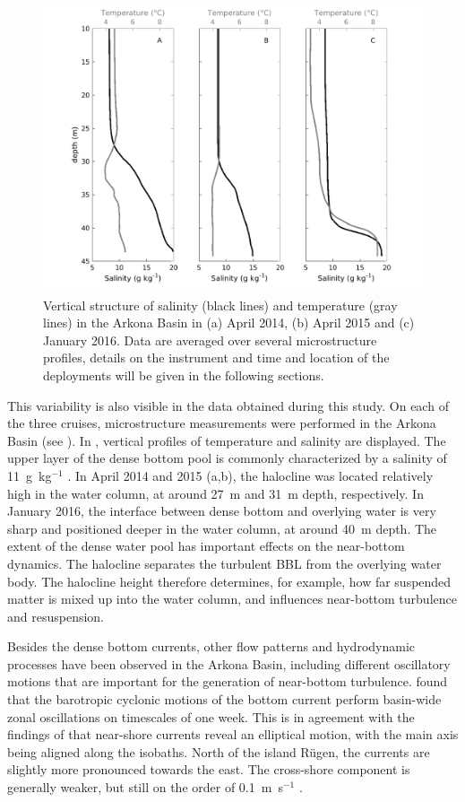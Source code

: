 \begin{figure}[ht]
\includegraphics[width=40pc]{bilder/arkona_TS.png}
 \caption{Vertical structure of salinity (black lines) and temperature (gray 
lines) in the Arkona Basin in (a) April 2014, (b) April 2015 and (c) January 
2016. Data are averaged over several microstructure profiles, details on the 
instrument and time and location of the deployments will be given in the 
following sections.}
 \label{TSarkona}
 \end{figure}
 
 This variability is also visible in the data obtained during this study. On 
each of the three cruises, microstructure measurements were performed in the 
Arkona Basin (see ). In , vertical profiles of 
temperature and salinity are displayed. The upper layer of the dense bottom pool 
is commonly characterized by a salinity of 11~g~kg$^{-1}$ \citep[][]{lass2005}. 
In April 2014 and 2015 (a,b), the halocline was located 
relatively high in the water column, at around 27~m and 31~m depth, 
respectively. In January 2016, the interface between dense bottom and overlying 
water is very sharp and positioned deeper in the water column, at around 40~m 
depth. The extent of the dense water pool has important effects on the 
near-bottom dynamics. The halocline separates the turbulent BBL from the 
overlying water body. The halocline height therefore determines, for example, 
how far suspended matter is mixed up into the water column, and influences 
near-bottom turbulence and resuspension.

Besides the dense bottom currents, other flow patterns and hydrodynamic 
processes have been observed in the Arkona Basin, including different 
oscillatory motions that are important for the generation of near-bottom 
turbulence. \cite{lass2003} found that the 
barotropic cyclonic motions of the bottom current perform basin-wide zonal 
oscillations on timescales of one week. This is in agreement with the findings 
of \cite{lass2001} that near-shore currents reveal an elliptical motion, with 
the main axis being aligned along the isobaths. North of the island 
R\"{u}gen, the currents are slightly more pronounced towards the east. The 
cross-shore component is generally weaker, but still on the order of 
0.1~m~s$^{-1}$ \citep[][]{lass1993, lass2001}. 

